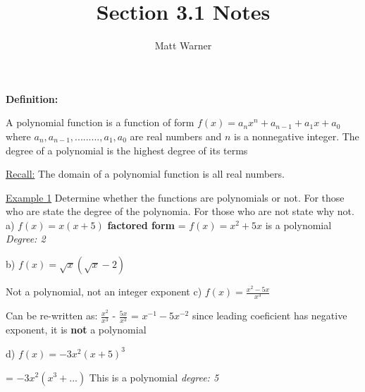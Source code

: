 \documentclass{report}
\title{\Huge{Section 3.1 Notes}}
\author{\huge{Matt Warner}}
\begin{document}
  \maketitle

  \begin{Large}
  \noindent \textbf{Definition:}

  \end{Large}  

  \bigbreak \noindent
  A polynomial function is a function of form $f(x) = a_nx^n + a_{n-1} + a_1x +a_0$ 
  \bigbreak \noindent
  where $a_n, a_{n-1},... ... ..., a_1, a_0$ are real numbers and $n$ is a nonnegative integer. 
  The degree of a polynomial is the highest degree of its terms

  \noindent \underline{Recall:}{
    The domain of a polynomial function is all real numbers.
  }

  \bigbreak
  \noindent \underline{Example 1}{
    Determine whether the functions are polynomials or not.
    For those who are state the degree of the polynomia.
    For those who are not state why not.
  }
  \bigbreak \noindent
  a) $f(x) = x(x+5)$
  \bigbreak
   \textbf{factored form }= $f(x) = x^2 + 5x$
   \bigbreak
   is a polynomial
  \bigbreak 
  \textit{Degree: 2}
  
  \bigbreak \bigbreak \noindent
  b) $f(x) = \sqrt{x}(\sqrt{x} - 2)$
  \bigbreak
  
  Not a polynomial, not an integer exponent
  \bigbreak \bigbreak \noindent
  c) $f(x) = \frac{x^2 - 5x}{x^3}$
  
  Can be re-written as: $\frac{x^2}{x^3}$ - $\frac{5x}{x^3}$
  \bigbreak
  =  $x^{-1} - 5x^{-2}$
  \bigbreak
  since leading coeficient has negative exponent, it is \textbf{not} a polynomial

  \bigbreak \bigbreak \noindent
  d) $f(x) = -3x^2(x+5)^3$

  = $-3x^2(x^3+...)$
  \bigbreak 
  This is a polynomial
  \bigbreak
  \textit{degree: 5}
\end{document}
